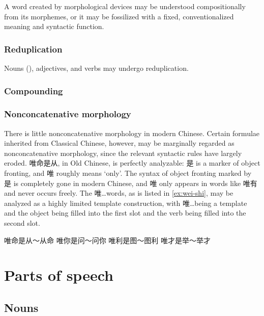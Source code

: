 \documentclass[UTF8, a4paper, oneside, scheme=plain]{ctexart}
\newcommand{\translate}[1]{`#1'}
\begin{document}
A word created by morphological devices 
may be understood compositionally from its morphemes,
or it may be fossilized with a fixed, conventionalized meaning 
and syntactic function.




\subsubsection{Reduplication}

Nouns (), 
adjectives, and verbs may undergo reduplication.

\subsubsection{Compounding}

\subsubsection{Nonconcatenative morphology}

There is little nonconcatenative morphology in modern Chinese.
Certain formulae inherited from Classical Chinese, however, 
may be marginally regarded as nonconcatenative morphology,
since the relevant syntactic rules have largely eroded.
唯命是从, in Old Chinese, is perfectly analyzable:
是 is a marker of object fronting, 
and 唯 roughly means \translate{only}.
The syntax of object fronting marked by 是 is completely gone in modern Chinese,
and  唯 only appears in words like 唯有 and never occurs freely.
The 唯\dots words, as is listed in \eqref{ex:wei-shi},
may be analyzed as a highly limited template construction,
with 唯\dots being a template and 
the object being filled into the first slot 
and the verb being filled into the second slot.
\begin{exe}
    \ex\label{ex:wei-shi} \begin{xlist}
        \ex 唯命是从～从命
        \ex 唯你是问～问你
        \ex 唯利是图～图利
        \ex 唯才是举～举才
    \end{xlist}
\end{exe}


\section{Parts of speech}

\subsection{Nouns}
\end{document}
